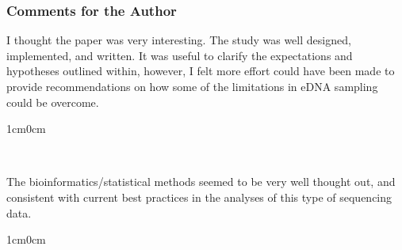 \documentclass{article}
\newenvironment{response}
	{
	\begin{adjustwidth}{1cm}{0cm}
	\itshape %
	}
	{
	\end{adjustwidth}
	}
\begin{document}
\subsubsection{Comments for the Author}
I thought the paper was very interesting. The study was well designed, implemented, and written. It was useful to clarify the expectations and hypotheses outlined within, however, I felt more effort could have been made to provide recommendations on how some of the limitations in eDNA sampling could be overcome.
\begin{response}
  \\
\end{response}

The bioinformatics/statistical methods seemed to be very well thought out, and consistent with current best practices in the analyses of this type of sequencing data.
\begin{response}
  \\
\end{response}
\end{document}
